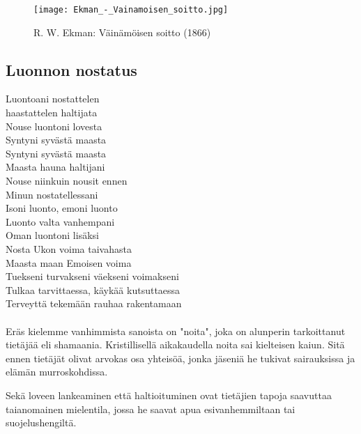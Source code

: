 
\vfill%
\begin{figure}[!ht]%
  \centering%
  \texttt{[image: Ekman\_-\_Vainamoisen\_soitto.jpg]}%
  \caption{R. W. Ekman: Väinämöisen soitto (1866)}%
\end{figure}
\vfill%


\clearpage
\subsection{Luonnon nostatus}
  \begin{large}\begin{center}\begin{em}
    Luontoani nostattelen\\
    haastattelen haltijata\\
    Nouse luontoni lovesta\\
    Syntyni syvästä maasta\\
    Syntyni syvästä maasta\\
    \vspace{1em}
    Maasta hauna haltijani\\
    Nouse niinkuin nousit ennen\\
    Minun nostatellessani\\
    \vspace{1em}
    Isoni luonto, emoni luonto\\
    Luonto valta vanhempani\\
    Oman luontoni lisäksi\\
    Nosta Ukon voima taivahasta\\
    Maasta maan Emoisen voima\\
    \vspace{1em}
    Tuekseni turvakseni väekseni voimakseni\\
    Tulkaa tarvittaessa, käykää kutsuttaessa\\
    Terveyttä tekemään rauhaa rakentamaan\\
  \end{em}\end{center}\end{large}

  \paragraph{}
    Eräs kielemme vanhimmista sanoista on "noita", joka on alunperin tarkoittanut tietäjää eli
    shamaania. Kristillisellä aikakaudella noita sai kielteisen kaiun. Sitä ennen tietäjät
    olivat arvokas osa yhteisöä, jonka jäseniä he tukivat sairauksissa ja elämän murroskohdissa.
    \par
    Sekä loveen lankeaminen että haltioituminen ovat tietäjien tapoja saavuttaa taianomainen
    mielentila, jossa he saavat apua esivanhemmiltaan tai suojelushengiltä.

